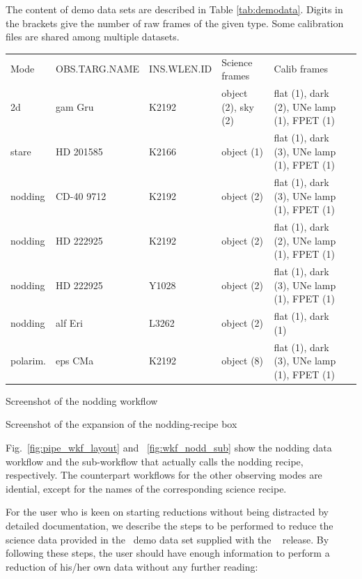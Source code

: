 \documentclass[pdftex,a4paper,twoside,11pt]{article}
\begin{document}
The content of demo data sets are described in Table \ref{tab:demodata}.
Digits in the brackets give the number of raw frames of the given type.
Some calibration files are shared among multiple datasets.


\begin{tabular}{|l|l|l|l|l|l|}
\hline
Mode & OBS.TARG.NAME & INS.WLEN.ID & Science frames & Calib frames \\
2d & gam Gru & K2192  & object (2), sky (2) & flat (1), dark (2), UNe lamp (1), FPET (1)\\
stare & HD 201585 & K2166  & object (1) & flat (1), dark (3), UNe lamp (1), FPET (1)\\
nodding & CD-40 9712 & K2192  & object (2) & flat (1), dark (3), UNe lamp (1), FPET (1)\\
nodding & HD 222925 & K2192  & object (2) & flat (1), dark (2), UNe lamp (1), FPET (1)\\
nodding & HD 222925 & Y1028  & object (2) & flat (1), dark (3), UNe lamp (1), FPET (1)\\
nodding & alf Eri & L3262  & object (2) & flat (1), dark (1)\\
polarim. & eps CMa & K2192  & object (8) & flat (1), dark (3), UNe lamp (1), FPET (1) \\
\hline
\end{tabular}
\label{tab:demodata}


    {Screenshot of the nodding workflow}

    {Screenshot of the expansion of the nodding-recipe box}

Fig.~\ref{fig:pipe_wkf_layout} and ~\ref{fig:wkf_nodd_sub} show the nodding data workflow
and the
sub-workflow that actually calls the nodding recipe, respectively.
The counterpart workflows for the other observing modes are idential,
except for the names of the corresponding science recipe.



For the user who is keen on starting reductions without being
distracted by detailed documentation, we describe the steps to be
performed to reduce the science data provided in the \instname\, demo
data set 
supplied with the \ {\tt {}} release. By following these
steps, the user should have enough information to perform a reduction
of his/her own data without any further reading:
\end{document}
